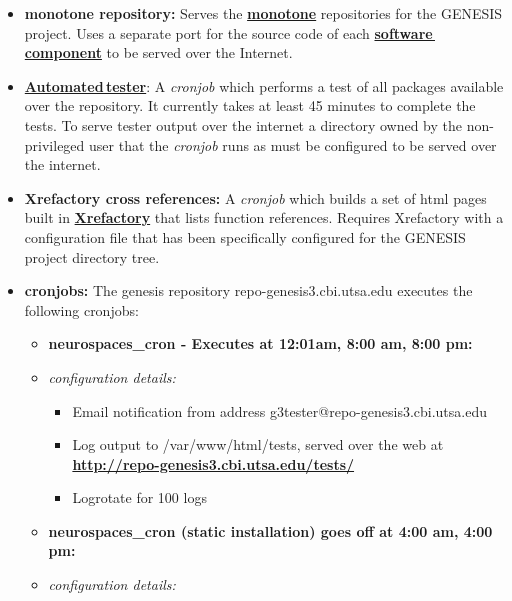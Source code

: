 \documentclass[12pt]{article}
\begin{document}
\begin{itemize}

\item {\bf monotone repository:} Serves the \href{http://www.monotone.ca/}{\bf monotone} repositories for the GENESIS project. Uses a separate port for the source code of each \href{../genesis-components/genesis-components.tex}{\bf software\,component} to be served over the Internet.

\item {\href{../neurospaces-tester/neurospaces-tester.tex}{\bf Automated\,tester}:} A {\it cronjob} which performs a test of all packages available over the repository.  It currently takes at least 45 minutes to complete the tests. To serve tester output over the internet a directory owned by the non-privileged user that the {\it cronjob} runs as must be configured to be served over the internet.

\item {\bf Xrefactory cross references:} A {\it cronjob} which builds a set of html pages built in \href{http://www.xref-tech.com/xrefactory/main.html}{\bf Xrefactory} that lists function references.  Requires Xrefactory with a configuration file that has been specifically configured for the GENESIS project directory tree. 

\item {\bf cronjobs:} The genesis repository repo-genesis3.cbi.utsa.edu executes the following cronjobs:

\begin{itemize}
\item[] {\bf neurospaces\_cron - Executes at 12:01am, 8:00 am, 8:00 pm:}
	\item {\it configuration details:} 
\begin{itemize}

	\item Email notification from address g3tester@repo-genesis3.cbi.utsa.edu
	\item Log output to /var/www/html/tests, served over the web at \href{http://repo-genesis3.cbi.utsa.edu/tests/}{\bf http://repo-genesis3.cbi.utsa.edu/tests/}
	\item Logrotate for 100 logs
\end{itemize}
		
\item[] {\bf neurospaces\_cron (static installation) \- goes off at 4:00 am, 4:00 pm:}
	\item {\it configuration details:} 
\begin{itemize}


\end{itemize}
\end{itemize}
\end{itemize}
\end{document}
